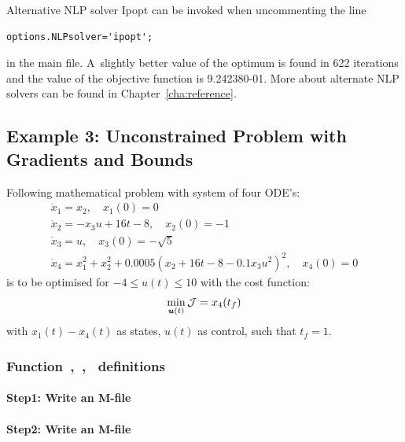 Alternative NLP solver Ipopt can be invoked when uncommenting the line 
\begin{verbatim}
options.NLPsolver='ipopt';
\end{verbatim}
in the main file. A~slightly better value of the optimum is found in
622 iterations and the value of the objective function is
9.242380-01. More about alternate NLP solvers can be found in
Chapter~\ref{cha:reference}.

\subsection{Example 3: Unconstrained Problem  with Gradients and Bounds}
\label{sec:unconprobgradbound}

Following mathematical problem \citep{raj01,luu90_51} with system of
four ODE's:
\begin{gather}
\dot{x}_1 = x_{2}, \quad x_{1}(0) = 0\\
\dot{x}_2 = -x_{3}u + 16t - 8, \quad x_{2}(0) = -1\\
\dot{x}_3 = u, \quad x_{3}(0) = -\sqrt{5}\\
\dot{x}_4 = x_{1}^{2} + x_{2}^{2} + 0.0005(x_{2} + 16t - 8 -
0.1x_{3}u^{2})^{2}, \quad x_{4}(0) = 0
\end{gather} is to be optimised for $-4 \leq u(t) \leq 10$ with the
cost function:  
\begin{equation}
\min_{\ve{u}(t)} \mf{J} = x_{4}(t_{f}) \label{eq:ucpgb}
\end{equation} with $x_1(t) - x_4(t)$ as states, $u(t)$ as control,
such that $t_{f}=1$. 

\subsubsection{Function~,~,~  definitions}
\label{sec:unconprbgradbound-fundef}

\paragraph{Step1: Write an M-file~}

{\small }

\paragraph{Step2: Write an M-file~}

{\small }

